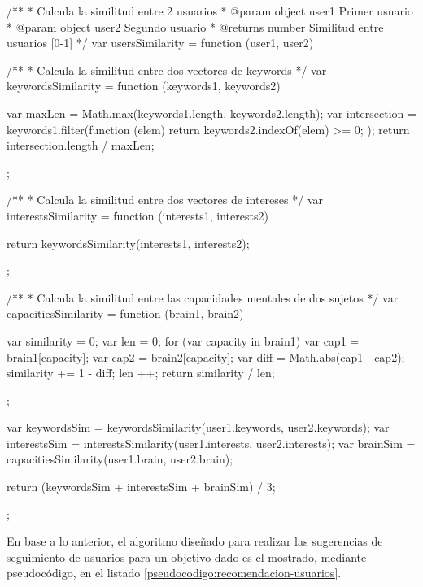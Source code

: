 \begin{listing}[caption=Algoritmo de recomendación de usuarios, label=codigo:similitud, language=JavaScript]
/**
 * Calcula la similitud entre 2 usuarios
 * @param {object} user1 Primer usuario
 * @param {object} user2 Segundo usuario
 * @returns {number} Similitud entre usuarios [0-1]
 */
var usersSimilarity = function (user1, user2) {

	/**
	 * Calcula la similitud entre dos vectores de keywords
	 */
	var keywordsSimilarity = function (keywords1, keywords2) {

		var maxLen = Math.max(keywords1.length, keywords2.length);
		var intersection = keywords1.filter(function (elem) {
			return keywords2.indexOf(elem) >= 0;
		});
		return intersection.length / maxLen;
	};

	/**
	 * Calcula la similitud entre dos vectores de intereses
	 */
	var interestsSimilarity = function (interests1, interests2) {

		return keywordsSimilarity(interests1, interests2);
	};

	/**
	 * Calcula la similitud entre las capacidades mentales de dos sujetos
	 */
	var capacitiesSimilarity = function (brain1, brain2) {

		var similarity = 0;
		var len = 0;
		for (var capacity in brain1) {
			var cap1 = brain1[capacity];
			var cap2 = brain2[capacity];
			var diff = Math.abs(cap1 - cap2);
			similarity += 1 - diff;
			len ++;
		}
		return similarity / len;
	};

	var keywordsSim = keywordsSimilarity(user1.keywords, user2.keywords);
	var interestsSim = interestsSimilarity(user1.interests, user2.interests);
	var brainSim = capacitiesSimilarity(user1.brain, user2.brain);

	return (keywordsSim + interestsSim + brainSim) / 3;
};
\end{listing}

En base a lo anterior, el algoritmo diseñado para realizar las sugerencias de seguimiento de usuarios para un objetivo dado es el mostrado, mediante pseudocódigo, en el listado \ref{pseudocodigo:recomendacion-usuarios}.

